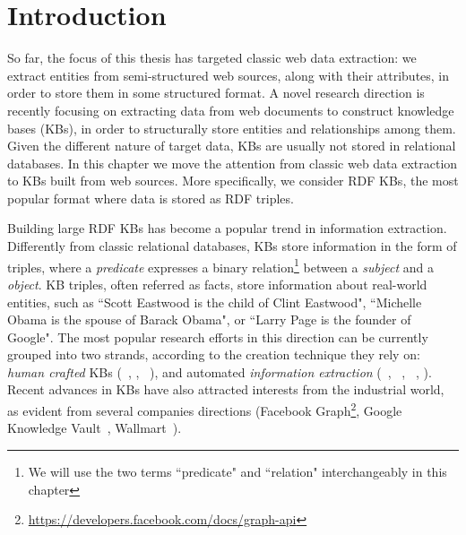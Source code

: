 \section{Introduction}
So far, the focus of this thesis has targeted classic web data extraction: we extract entities from semi-structured web sources, along with their attributes, in order to store them in some structured format. A novel research direction is recently focusing on extracting data from web documents to construct knowledge bases (KBs), in order to structurally store entities and relationships among them. Given the different nature of target data, KBs are usually not stored in relational databases. In this chapter we move the attention from classic web data extraction to KBs built from web sources. More specifically, we consider RDF KBs, the most popular format where data is stored as RDF triples.

Building large RDF KBs has become a popular trend in information extraction.
Differently from classic relational databases, KBs store information in the form of triples, where a \emph{predicate} expresses a binary relation\footnote{We will
	use the two terms ``predicate" and ``relation" interchangeably in this chapter} between a \emph{subject} and a \emph{object}. KB triples, often referred as facts, store information about real-world entities, such as ``Scott Eastwood is the child of Clint Eastwood", ``Michelle Obama is the spouse of Barack Obama", or ``Larry Page is the founder of Google".
The most popular research efforts in this direction can be currently grouped into two strands, according to the creation technique they rely on: \emph{human crafted} KBs (~\cite{bizer2009dbpedia}, \cite{bollacker2008freebase}, ~\cite{vrandevcic2014wikidata}), and automated \emph{information extraction} (\deepdive~\cite{shin2015incremental}, ~\cite{suchanek2008yago}, ~\cite{carlson2010toward}, \cite{banko2007open}). 
Recent advances in KBs have also attracted interests from the industrial world, as evident from several companies directions (Facebook Graph\footnote{\url{https://developers.facebook.com/docs/graph-api}}, Google Knowledge Vault~\cite{dong2014knowledge}, Wallmart~\cite{deshpande2013building}).


